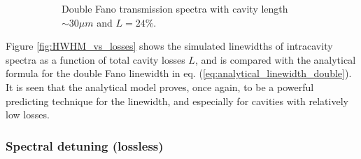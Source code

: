 \begin{figure}[h!]
\begin{subfigure}[c]{0.34\textwidth}
        \caption{Double Fano transmission spectra with cavity length $\sim 30 \mu m$ and $L = 24\%$.}
    \end{subfigure}
    \caption{}
    \label{fig:HWHM_vs_losses_whole_figure}
\end{figure}

Figure \ref{fig:HWHM_vs_losses} shows the simulated linewidths of intracavity spectra as a function of total cavity losses $L$, and is compared with the analytical formula for the double Fano linewidth in eq. (\ref{eq:analytical_linewidth_double}). It is seen that the analytical model proves, once again, to be a powerful predicting technique for the linewidth, and especially for cavities with relatively low losses. 

\subsubsection{Spectral detuning (lossless)} \label{sec:spectral_detuning}

